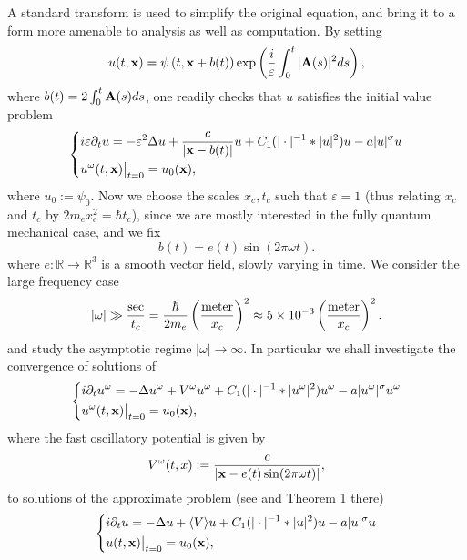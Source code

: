 \documentclass[10pt, leqno]{amsart}
\newcommand{\R}{\mathbb{R}}
\newcommand{\beq}{\begin{equation}}
\newcommand{\ee}{\end{equation}}
\newcommand{\dpm}{\displaystyle}
\newcommand{\xb}{\boldsymbol{\rm{x}}}
\newcommand{\Ab}{\boldsymbol{\rm{A}}}
\def\({\left(}
\def\){\right)}
\newcommand{\eps}{\varepsilon}
\begin{document}
A standard transform is used to simplify the original equation, and bring it to a form more amenable to analysis as well as computation. By setting
\beq
\label{eqlenrd}
u(t,\xb) = \psi\(t, \xb + b(t)\) \exp\(\frac{i}{\eps}\dpm\int_0^t{|\Ab(s)|^2ds}\),
\ee
where $b(t)=2\int_0^t\Ab(s)ds$,
one readily checks that $u$ satisfies the initial value problem
\begin{equation}
\label{eq:fast-1}
\left\{\begin{aligned}
&i\eps\partial_tu=-\eps^2\Delta u+\frac{c}{|\xb-b(t)|} u+C_1(|\cdot|^{-1}\ast|u|^2)u
-a|u|^\sigma u\\
&u^\omega(t,\xb)\big|_{t=0}=u_0(\xb),
\end{aligned}\right.
\end{equation}
where $u_0:=\psi_0$.
Now we choose the scales $x_c, t_c$ such that $\eps=1$ (thus relating $x_c$ and $t_c$ by $2m_ex_c^2=\hbar t_c$), since we are mostly interested in the fully quantum mechanical case, and we fix
\begin{equation*}
b(t)=e(t)\sin(2\pi\omega t).
\end{equation*}
where $e:\R\to\R^3$ is a smooth vector field, slowly varying in time.%
We consider the large frequency case
\begin{equation*}
|\omega|\gg\frac{{\rm sec}}{t_c}=\frac{\hbar}{2m_e}\left(\frac{{\rm meter}}{x_c}\right)^2\approx 5\times10^{-3}\left(\frac{{\rm meter}}{x_c}\right)^2.
\end{equation*}
and study the asymptotic regime $|\omega|\to\infty$. In particular we shall investigate the convergence of solutions of
\begin{equation}\label{eq:fast}
\left\{\begin{aligned}
&i\partial_tu^\omega=-\Delta u^\omega+V^\omega u^\omega+C_1(|\cdot|^{-1}\ast|u^\omega|^2)u^\omega-a|u^\omega|^\sigma u^\omega\\
&u^\omega(t,\xb)\big|_{t=0}=u_0(\xb),
\end{aligned}\right.
\end{equation}
where the fast oscillatory potential is given by
\begin{equation}\label{eq:fast-p}
V^\omega(t, x):=\frac{c}{|\xb-e(t)\sin(2\pi\omega t)|},
\end{equation}
to solutions of the approximate problem (see \cite{xfel1} and Theorem 1 there)
\begin{equation}\label{eq:avr}
\left\{\begin{aligned}
&i\partial_tu=-\Delta u+\langle V\rangle u+C_1(|\cdot|^{-1}\ast|u|^2)u-a|u|^\sigma u\\
&u(t,\xb)\big|_{t=0}=u_0(\xb),
\end{aligned}\right.
\end{equation}
\end{document}
